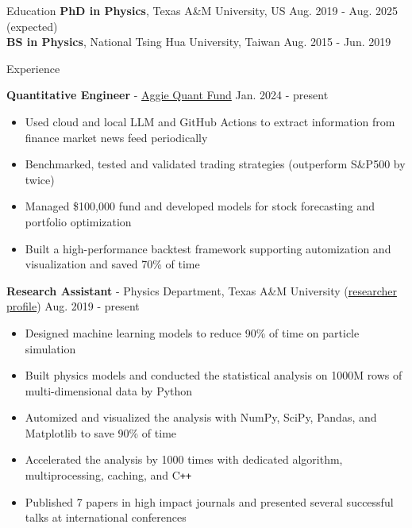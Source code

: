 \documentclass{resume}
\begin{document}
\vspace{-1.5em}
\begin{rSection}{Education}
\vspace{-0.25em}
{\bf PhD in Physics}, Texas A\&M University, US \hfill {Aug. 2019 - Aug. 2025 (expected)} \\
{\bf BS in Physics}, National Tsing Hua University, Taiwan \hfill {Aug. 2015 - Jun. 2019}
\end{rSection}


\begin{rSection}{Experience}
    \vspace{-1em}
    \item \textbf{Quantitative Engineer} - \href{https://www.linkedin.com/company/aggieqf}{Aggie Quant Fund} \hfill Jan. 2024 - present
        \begin{itemize}
        \item Used cloud and local LLM and GitHub Actions to extract information from finance market news feed periodically
        \item Benchmarked, tested and validated trading strategies (outperform S\&P500 by twice)
        \item Managed \$100,000 fund and developed models for stock forecasting and portfolio optimization
        \item Built a high-performance backtest framework supporting automization and visualization and saved 70\% of time
        \end{itemize}

    \item \textbf{Research Assistant} - Physics Department, Texas A\&M University (\href{https://inspirehep.net/authors/2661451}{researcher profile}) \hfill Aug. 2019 - present
        \begin{itemize}
        \item Designed machine learning models to reduce 90\% of time on particle simulation
        \item Built physics models and conducted the statistical analysis on 1000M rows of multi-dimensional data by Python
        \item Automized and visualized the analysis with NumPy, SciPy, Pandas, and Matplotlib to save 90\% of time
        \item Accelerated the analysis by 1000 times with dedicated algorithm, multiprocessing, caching, and C\texttt{++}
        \item Published 7 papers in high impact journals and presented several successful talks at international conferences
        \end{itemize}


\end{rSection}
\end{document}
